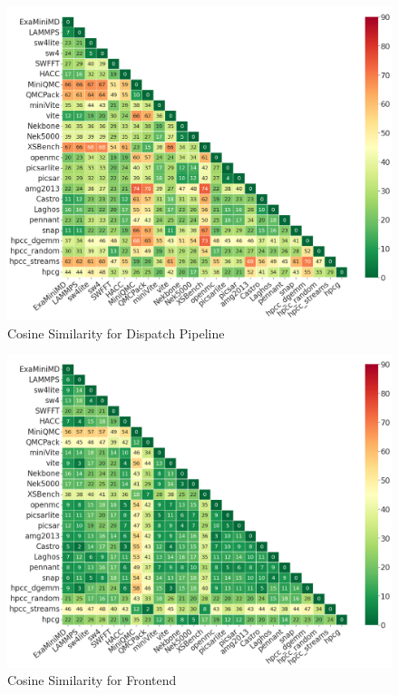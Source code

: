 \begin{figure}[ht]
\centering
\includegraphics[width=0.9\linewidth]{figs/Dispatch_Pipeline.png}
\caption{Cosine Similarity for Dispatch Pipeline }
\label{figs:cosine Dispatch_Pipeline}
\end{figure}



\begin{figure}[ht]
\centering
\includegraphics[width=0.9\linewidth]{figs/Frontend.png}
\caption{Cosine Similarity for Frontend }
\label{figs:cosine Frontend}
\end{figure}

